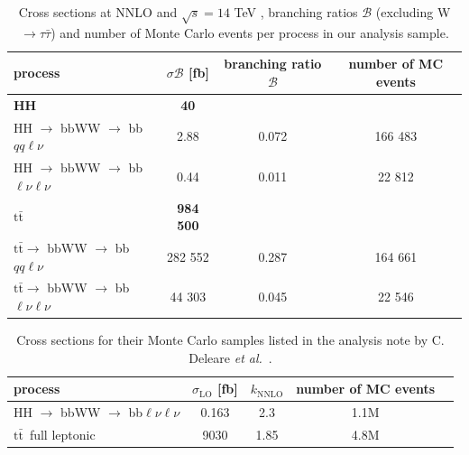 \documentclass[10pt,a4paper]{article}
\renewcommand{\tt}{\ensuremath{\text{t}\bar{\text{t}}}}
\newcommand{\di}{$\rightarrow$ bbWW $\rightarrow$ bb$\ell\nu \ell\nu$}
\newcommand{\semi}{$\rightarrow$ bbWW $\rightarrow$ bb$qq\ell\nu$}
\newcommand{\sAN}{$\sigma_1$}
\newcommand{\BR}{\mathcal{B}}
\newcommand{\etal}{\emph{et al.}}
\begin{document}
\begin{table}[p]
	\centering
	\caption{Cross sections at NNLO and $\sqrt{s}=14$ TeV \cite{sigma_HH}\cite{sigma_tt}, branching ratios $\BR$ (excluding W $\rightarrow \tau\bar{\tau}$) \cite{BR_HH}\cite{BR_tt}\cite{BR_W} and number of Monte Carlo events per process in our analysis sample.} \vspace{5pt}
	\label{sigma}
	\begin{tabular}{@{}lccc@{}}
	\toprule
	process      & $\sigma\BR$ [fb] & branching ratio $\BR$ & number of MC events \\
	\midrule
	\textbf{HH}  & \textbf{40}      &           & \\ %
	HH \semi     &        2.88      &   0.072   &  166 483  \\
	HH \di       &        0.44      &   0.011   &   22 812  \\
	\textbf{\tt} & \textbf{984 500} &           & \\ %
	\tt \semi    &     282 552      &   0.287   &  164 661  \\
	\tt \di      &      44 303      &   0.045   &   22 546  \\
	\bottomrule
	\end{tabular}
\end{table}


\begin{table}[p]
	\centering
	\caption{Cross sections for their Monte Carlo samples listed in the analysis note by C. Deleare \etal\ \cite{AN}.} \vspace{5pt} %
	\label{sigma_AN}
	\begin{tabular}{@{}lcccc@{}}
	\toprule
	process            & $\sigma_\text{LO}$ [fb] & $k_\text{NNLO}$ & number of MC events \\
	\midrule
	HH \di             &  0.163  &   2.3   & 1.1M \\
	\tt\ full leptonic &  9030   &  1.85   & 4.8M \\
	\bottomrule
	\end{tabular}
\end{table}
\end{document}
